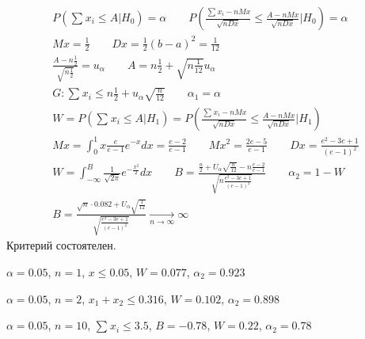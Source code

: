 \documentclass{article}
\begin{document}
\begin{eg}[Т11 из задания]
\begin{gather*}
    P(\sum_{}^{}x_i \le A | H_0) = \alpha \qquad P(\frac{\sum_{}^{}x_i-nMx}{\sqrt{nDx}}\le \frac{A-nMx}{\sqrt{nDx}}|H_0)=\alpha \\ 
    Mx=\frac{1}{2} \qquad Dx = \frac{1}{2}(b-a)^{2}=\frac{1}{12} \\ 
    \frac{A-n\frac{1}{2}}{\sqrt{n\frac{1}{2}}}=u_\alpha \qquad A = n\frac{1}{2}+\sqrt{n\frac{1}{12}}u_\alpha \\ 
    G: \sum_{}^{}x_i \le n\frac{1}{2} + u_\alpha\sqrt{\frac{n}{12}} \qquad \alpha_1=\alpha \\
    W=P(\sum_{}^{}x_i \le A | H_1)=P(\frac{\sum_{}^{}x_i-nMx}{\sqrt{nDx}}\le \frac{A-nMx}{\sqrt{nDx}}|H_1) \\ 
    Mx = \int_{0}^{1}x \frac{e}{e-1}e^{-x}dx = \frac{e-2}{e-1} \qquad Mx^{2}=\frac{2e-5}{e-1} \qquad Dx=\frac{e^{2}-3e+1}{(e-1)^{2}} \\ 
    W = \int_{-\infty}^{B}\frac{1}{\sqrt{2\pi}}e^{-\frac{x^{2}}{2}}dx \qquad B=\frac{\frac{n}{2}+U_\alpha\sqrt{\frac{n}{12}}-n\frac{e-2}{e-1}}{\sqrt{n\frac{e^{2}-3e+1}{(e-1)^{2}}}} \qquad \alpha_2 = 1- W \\
    B=\frac{\sqrt{n}\cdot 0.082 + U_\alpha \sqrt{\frac{1}{12}}}{\sqrt{\frac{e^{2}-3e+1}{(e-1)^{2}}}} \underset{n\to\infty}{\to}\infty
  \end{gather*}
  Критерий состоятелен.

  \hr
  $\alpha=0.05$, $n=1$, $x \le 0.05$, $W=0.077$, $\alpha_2=0.923$

  $\alpha=0.05$, $n=2$, $x_1+x_2 \le 0.316$, $W=0.102$, $\alpha_2=0.898$

  $\alpha=0.05$, $n=10$, $\sum_{}^{}x_i \le 3.5$, $B=-0.78$, $W=0.22$, $\alpha_2=0.78$



\end{eg}
\end{document}
